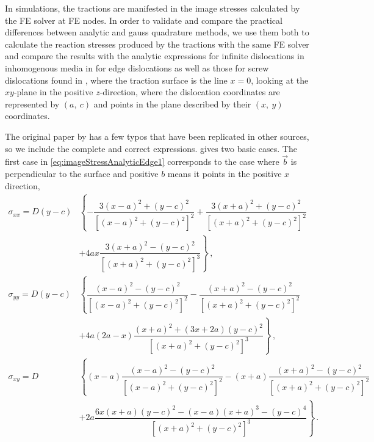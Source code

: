 \documentclass[11pt]{iopart}
\begin{document}
In simulations, the tractions are manifested in the image stresses calculated by the FE solver at FE nodes. In order to validate and compare the practical differences between analytic and gauss quadrature methods, we use them both to calculate the reaction stresses produced by the tractions with the same FE solver and compare the results with the analytic expressions for infinite dislocations in inhomogenous media in \cite{head1953edge} for edge dislocations as well as those for screw dislocations found in \cite[p.~59,~64]{hirth1983theory}, where the traction surface is the line $x=0$, looking at the $xy$-plane in the positive $z$-direction, where the dislocation coordinates are represented by $(a,~c)$ and points in the plane described by their $(x,~y)$ coordinates.

The original paper by \citet{head1953edge} has a few typos that have been replicated in other sources, so we include the complete and correct expressions. \citet{head1953edge} gives two basic cases. The first case in \cref{eq:imageStressAnalyticEdge1} corresponds to the case where $\vec{b}$ is perpendicular to the surface and positive $b$ means it points in the positive $x$ direction,
\begin{subequations}
    \begin{align}\label{eq:imageStressAnalyticEdge1}
        \sigma_{xx} = D (y - c) & \left\{-\dfrac{3 (x - a)^2 + (y - c)^2}{[(x - a)^2 + (y - c)^2]^2} + \dfrac{3 (x + a)^2 + (y - c)^2}{[(x + a)^2 + (y - c)^2]^2}\right.                                             \\\nonumber
                                & \left. + 4 a x \dfrac{3 (x + a)^2 - (y - c)^2}{[(x + a)^2 + (y - c)^2]^3}\right\}\,,                                                                                               \\
        \sigma_{yy} = D (y - c) & \left\{\dfrac{(x - a)^2 - (y - c)^2}{[(x - a)^2 + (y - c)^2]^2} - \dfrac{(x + a)^2 - (y - c)^2}{[(x + a)^2 + (y - c)^2]^2}                                                 \right. \\\nonumber
                                & \left. + 4 a (2 a - x) \dfrac{(x + a)^2 + (3 x + 2 a) (y - c)^2}{[(x + a)^2 + (y - c)^2]^3}\right\}\,,                                                                             \\
        \sigma_{xy} = D         & \left\{(x - a) \dfrac{(x - a)^2 - (y - c)^2}{[(x - a)^2 + (y - c)^2]^2} - (x + a) \dfrac{(x + a)^2 - (y - c)^2}{[(x + a)^2 + (y - c)^2]^2}\right.                                  \\\nonumber
                                & \left. + 2 a \dfrac{6 x (x + a) (y - c)^2 - (x - a) (x + a)^3 - (y - c)^4}{[(x + a)^2 + (y - c)^2]^3}\right\}\,.
    \end{align}
\end{subequations}
\end{document}
